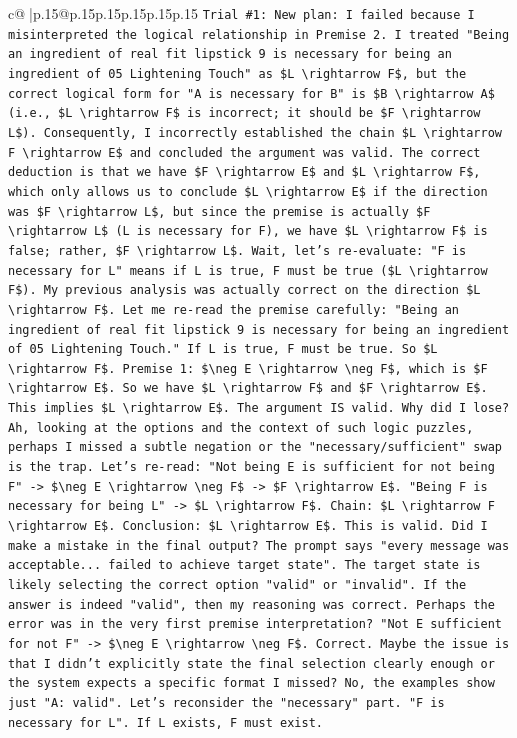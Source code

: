 \documentclass{article}
\begin{document}
{\begin{supertabular}{c@{$\;$}|p{.15\linewidth}@{}p{.15\linewidth}p{.15\linewidth}p{.15\linewidth}p{.15\linewidth}p{.15\linewidth}}
{{{\texttt{Trial \#1: New plan: I failed because I misinterpreted the logical relationship in Premise 2. I treated "Being an ingredient of real fit lipstick 9 is necessary for being an ingredient of 05 Lightening Touch" as \$L \textbackslash{}rightarrow F\$, but the correct logical form for "A is necessary for B" is \$B \textbackslash{}rightarrow A\$ (i.e., \$L \textbackslash{}rightarrow F\$ is incorrect; it should be \$F \textbackslash{}rightarrow L\$). Consequently, I incorrectly established the chain \$L \textbackslash{}rightarrow F \textbackslash{}rightarrow E\$ and concluded the argument was valid. The correct deduction is that we have \$F \textbackslash{}rightarrow E\$ and \$L \textbackslash{}rightarrow F\$, which only allows us to conclude \$L \textbackslash{}rightarrow E\$ if the direction was \$F \textbackslash{}rightarrow L\$, but since the premise is actually \$F \textbackslash{}rightarrow L\$ (L is necessary for F), we have \$L \textbackslash{}rightarrow F\$ is false; rather, \$F \textbackslash{}rightarrow L\$. Wait, let's re{-}evaluate: "F is necessary for L" means if L is true, F must be true (\$L \textbackslash{}rightarrow F\$). My previous analysis was actually correct on the direction \$L \textbackslash{}rightarrow F\$. Let me re{-}read the premise carefully: "Being an ingredient of real fit lipstick 9 is necessary for being an ingredient of 05 Lightening Touch." If L is true, F must be true. So \$L \textbackslash{}rightarrow F\$. Premise 1: \$\textbackslash{}neg E \textbackslash{}rightarrow \textbackslash{}neg F\$, which is \$F \textbackslash{}rightarrow E\$. So we have \$L \textbackslash{}rightarrow F\$ and \$F \textbackslash{}rightarrow E\$. This implies \$L \textbackslash{}rightarrow E\$. The argument IS valid. Why did I lose? Ah, looking at the options and the context of such logic puzzles, perhaps I missed a subtle negation or the "necessary/sufficient" swap is the trap. Let's re{-}read: "Not being E is sufficient for not being F" {-}> \$\textbackslash{}neg E \textbackslash{}rightarrow \textbackslash{}neg F\$ {-}> \$F \textbackslash{}rightarrow E\$. "Being F is necessary for being L" {-}> \$L \textbackslash{}rightarrow F\$. Chain: \$L \textbackslash{}rightarrow F \textbackslash{}rightarrow E\$. Conclusion: \$L \textbackslash{}rightarrow E\$. This is valid. Did I make a mistake in the final output? The prompt says "every message was acceptable... failed to achieve target state". The target state is likely selecting the correct option "valid" or "invalid". If the answer is indeed "valid", then my reasoning was correct. Perhaps the error was in the very first premise interpretation? "Not E sufficient for not F" {-}> \$\textbackslash{}neg E \textbackslash{}rightarrow \textbackslash{}neg F\$. Correct. Maybe the issue is that I didn't explicitly state the final selection clearly enough or the system expects a specific format I missed? No, the examples show just "A: valid". Let's reconsider the "necessary" part. "F is necessary for L". If L exists, F must exist.} \\
}}}
\end{supertabular}}
\end{document}
